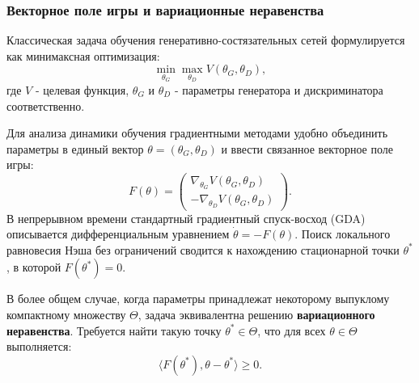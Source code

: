 \documentclass[12pt,a4paper]{article}
\begin{document}
	\subsubsection{Векторное поле игры и вариационные неравенства}
	Классическая задача обучения генеративно-состязательных сетей формулируется как минимаксная оптимизация:
	\begin{equation}
		\min_{\theta_G} \max_{\theta_D} V(\theta_G, \theta_D),
	\end{equation}
	где $V$ - целевая функция, $\theta_G$ и $\theta_D$ - параметры генератора и дискриминатора соответственно. 
	
	Для анализа динамики обучения градиентными методами удобно объединить параметры в единый вектор $\theta = (\theta_G, \theta_D)$ и ввести связанное векторное поле игры:
	\begin{equation}
		F(\theta) = \begin{pmatrix}
			\nabla_{\theta_G} V(\theta_G, \theta_D) \\
			-\nabla_{\theta_D} V(\theta_G, \theta_D)
		\end{pmatrix}.
	\end{equation}
	В непрерывном времени стандартный градиентный спуск-восход (GDA) описывается дифференциальным уравнением $\dot{\theta} = -F(\theta)$. Поиск локального равновесия Нэша без ограничений сводится к нахождению стационарной точки $\theta^*$, в которой $F(\theta^*) = 0$. 
	
	В более общем случае, когда параметры принадлежат некоторому выпуклому компактному множеству $\Theta$, задача эквивалентна решению \textbf{вариационного неравенства}. Требуется найти такую точку $\theta^* \in \Theta$, что для всех $\theta \in \Theta$ выполняется:
	\begin{equation}
		\langle F(\theta^*), \theta - \theta^* \rangle \ge 0.
	\end{equation}
	
	
\end{document}
